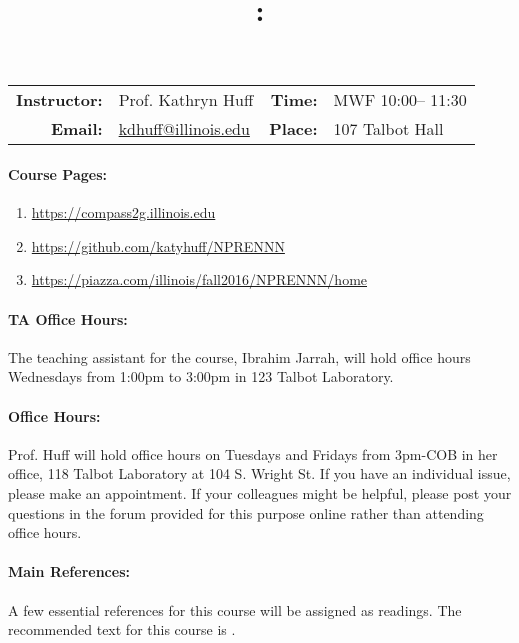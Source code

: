 \documentclass[11pt, a4paper]{article}
\title{\CourseNumber: \CourseTitle\\}
\author{\CourseUniversity}
\date{\CourseSemester \CourseYear}
\makeatletter
\newcommand{\CourseNumber}{NPRENNN}
\newcommand{\CourseInstructor}{Prof. Kathryn Huff\xspace}%
\newcommand{\CourseDays}{MWF\xspace}%
\newcommand{\CourseStart}{10:00\xspace}%
\newcommand{\CourseEnd}{11:30\xspace}%
\newcommand{\CourseInstructorEmail}{kdhuff@illinois.edu}
\newcommand{\CourseRoom}{107\xspace}%
\newcommand{\CourseBuilding}{Talbot Hall\xspace}%
\newcommand{\TeachingAssistant}{Ibrahim Jarrah\xspace}%
\newcommand{\TAOfficeHourDays}{Wednesdays\xspace}%
\newcommand{\TAOfficeHourStart}{1:00pm\xspace}%
\newcommand{\TAOfficeHourEnd}{3:00pm\xspace}%
\newcommand{\TAOfficeHourPlace}{123 Talbot Laboratory\xspace}
\makeatother
\begin{document}
\maketitle
\renewcommand{\arraystretch}{1.5}
\begin{center}
\begin{table}[h]
\begin{tabularx}{\textwidth}{rXrX}
\hline
\textbf{Instructor:} & \CourseInstructor & \textbf{Time:} & \CourseDays \CourseStart -- \CourseEnd \\
\textbf{Email:} &  \href{mailto:\CourseInstructorEmail}{\CourseInstructorEmail} & \textbf{Place:} & \CourseRoom \CourseBuilding\\
\hline
\end{tabularx}
\end{table}
\end{center}

\paragraph{Course Pages:}
\begin{enumerate}
        \item \url{https://compass2g.illinois.edu}
        \item \url{https://github.com/katyhuff/\CourseNumber}
        \item \url{https://piazza.com/illinois/fall2016/\CourseNumber/home}
\end{enumerate}

\paragraph{TA Office Hours:} The teaching assistant for the course, 
\TeachingAssistant, will hold office hours \TAOfficeHourDays from 
\TAOfficeHourStart to \TAOfficeHourEnd in \TAOfficeHourPlace.

\paragraph{Office Hours:} Prof. Huff will hold office hours on Tuesdays and 
Fridays from 3pm-COB in her office, 118 Talbot Laboratory at 104 S. Wright St. 
If you have an individual issue, please make an appointment. If your colleagues 
might be helpful, please post your questions in the forum provided for this 
purpose online rather than attending office hours.

\paragraph{Main References:}
A few essential references for this course will be assigned as readings. The 
recommended text for this course is \cite{rec_text}.

\renewcommand{\refname}{\normalfont\selectfont\normalsize}\vspace{-1cm} 

\end{document}
